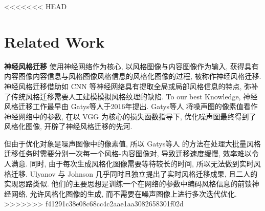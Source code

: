 <<<<<<< HEAD
\section{Related Work}

\textbf{神经风格迁移} 使用神经网络作为核心, 以风格图像与内容图像作为输入, 获得具有内容图像内容信息与风格图像风格信息的风格化图像的过程, 被称作神经风格迁移. 神经风格迁移借助如 CNN\cite{tammina2019transfer} 等神经网络具有提取全局或局部风格信息的特点, 弥补了传统风格迁移需要人工建模模拟风格纹理的缺陷. To our best Knowledge, 神经风格迁移工作最早由 Gatys等人于2016年\cite{gatys2016image}提出. Gatys等人\cite{gatys2016image} 将噪声图的像素值看作神经网络中的参数, 在以 VGG\cite{simonyan2014very} 为核心的损失函数指导下, 优化噪声图最终得到了风格化图像, 开辟了神经风格迁移的先河. 

但由于优化对象是噪声图像中的像素值, 所以 Gatys等人\cite{gatys2016image} 的方法在处理大批量风格迁移任务时需要分别一次每一个风格-内容图像对, 导致迁移速度缓慢, 效率难以令人满意. 同时, 由于每次生成风格化图像需要等待较长的时间, 所以无法做到实时风格迁移. Ulyanov\cite{ulyanov2016texture} 与 Johnson\cite{johnson2016perceptual} 几乎同时且独立提出了实时风格迁移成果, 且二人的实现思路类似. 他们的主要思想是训练一个在网络的参数中编码风格信息的前馈神经网络, 允许风格化图像的生成, 而不需要在噪声图像上进行多次迭代优化. 
>>>>>>> f41291c38e08c68cc4c2aae1aa3082658301f02d

